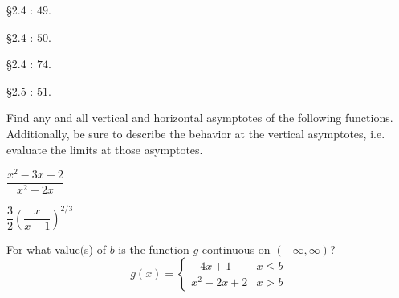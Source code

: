 \documentclass[unboxed]{hwset}
\begin{document}
\begin{problem}[1.]
	\be
		\item \S 2.4 : $49$.
		\item \S 2.4 : $50$.
		\item \S 2.4 : $74$.
	\ee
\end{problem}

\begin{problem}[2.] \S 2.5 : $51$.
\end{problem}

\begin{problem}[3.]
	Find any and all vertical and horizontal asymptotes of the following
	functions. Additionally, be sure to describe the behavior at the vertical
	asymptotes, i.e. evaluate the limits at those asymptotes. 
	\be
		\item $\dfrac{x^2-3x+2}{x^2-2x}$
		\item $\dfrac{3}{2} \left(\dfrac{x}{x-1}\right)^{2/3}$
	\ee
\end{problem}

\begin{problem}[4.] For what value(s) of $b$ is the function $g$ continuous
on $(-\infty,\infty)$?
	\begin{equation*}
		g(x)=\begin{cases} 
			-4x+1 & x\leq b \\
				x^2-2x+2 & x>b
			\end{cases}
	\end{equation*}
\end{problem}
\end{document}
